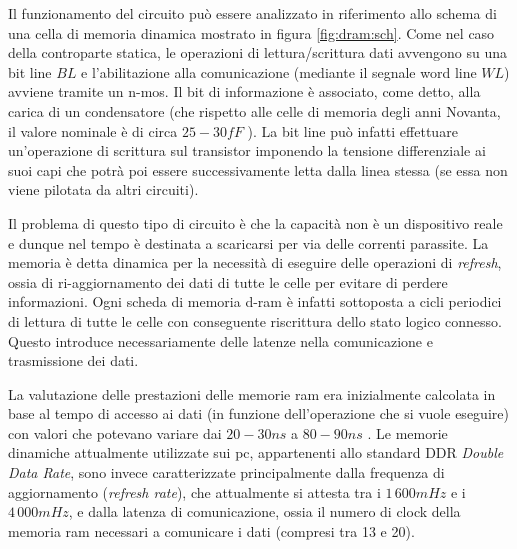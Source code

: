 	Il funzionamento del circuito può essere analizzato in riferimento allo schema di una cella di memoria dinamica mostrato in figura \ref{fig:dram:sch}. Come nel caso della controparte statica, le operazioni di lettura/scrittura dati avvengono su una bit line $BL$ e l'abilitazione alla comunicazione (mediante il segnale word line $WL$) avviene tramite un n-mos. Il bit di informazione è associato, come detto, alla carica di un condensatore (che rispetto alle celle di memoria degli anni Novanta, il valore nominale è di circa $25-30fF$ \cite{raminfo}). La bit line può infatti effettuare un'operazione di scrittura sul transistor imponendo la tensione differenziale ai suoi capi che potrà poi essere successivamente letta dalla linea stessa (se essa non viene pilotata da altri circuiti).
	
	Il problema di questo tipo di circuito è che la capacità non è un dispositivo reale e dunque nel tempo è destinata a scaricarsi per via delle correnti parassite. La memoria è detta dinamica per la necessità di eseguire delle operazioni di \textit{refresh}, ossia di ri-aggiornamento dei dati di tutte le celle per evitare di perdere informazioni. Ogni scheda di memoria d-ram è infatti sottoposta a cicli periodici di lettura di tutte le celle con conseguente riscrittura dello stato logico connesso. Questo introduce necessariamente delle latenze nella comunicazione e trasmissione dei dati.
	
	La valutazione delle prestazioni delle memorie ram era inizialmente calcolata in base al tempo di accesso ai dati (in funzione dell'operazione che si vuole eseguire) con valori che potevano variare dai $20-30ns$ a $80-90ns$ \cite{raminfo}. Le memorie dinamiche attualmente utilizzate sui pc, appartenenti allo standard DDR \textit{Double Data Rate}, sono invece caratterizzate principalmente dalla frequenza di aggiornamento (\textit{refresh rate}), che attualmente si attesta tra i $1\,600 mHz$ e i $4\,000 mHz$, e dalla latenza di comunicazione, ossia il numero di clock della memoria ram necessari a comunicare i dati (compresi tra 13 e 20).



